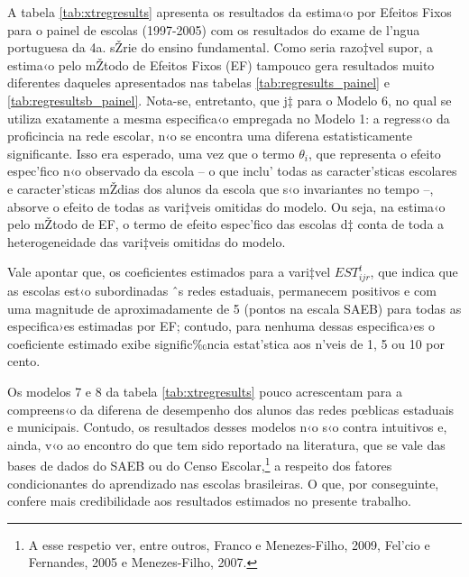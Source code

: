 \documentclass[a4paper, 12pt]{article}
\begin{document}




A tabela \ref{tab:xtregresults} apresenta os resultados da estima‹o por Efeitos Fixos para o painel de escolas (1997-2005) com os resultados do exame de l’ngua portuguesa da 4a. sŽrie do ensino fundamental. Como seria razo‡vel supor, a estima‹o pelo mŽtodo de Efeitos Fixos (EF) tampouco gera resultados muito diferentes daqueles apresentados nas tabelas \ref{tab:regresults_painel} e \ref{tab:regresultsb_painel}. Nota-se, entretanto, que j‡ para o Modelo 6, no qual se utiliza exatamente a mesma especifica‹o empregada no Modelo 1: a regress‹o da proficincia na rede escolar, n‹o se encontra uma diferena estatisticamente significante. Isso era esperado, uma vez que o termo $\theta_{i}$, que representa o efeito espec’fico n‹o observado da escola -- o que inclu’ todas as caracter’sticas escolares e caracter’sticas mŽdias dos alunos da escola que s‹o invariantes no tempo --, absorve o efeito de todas as vari‡veis omitidas do modelo. Ou seja, na estima‹o pelo mŽtodo de EF, o termo de efeito espec’fico das escolas d‡ conta de toda a heterogeneidade das vari‡veis omitidas do modelo. 

Vale apontar que, os coeficientes estimados para a vari‡vel $EST_{ijr}^{t}$, que indica que as escolas est‹o subordinadas ˆs redes estaduais, permanecem positivos e com uma magnitude de aproximadamente de 5 (pontos na escala SAEB) para todas as especifica›es estimadas por EF; contudo, para nenhuma dessas especifica›es o coeficiente estimado exibe signific‰ncia estat’stica aos n’veis de 1, 5 ou 10 por cento.

Os modelos 7 e 8 da tabela \ref{tab:xtregresults} pouco acrescentam para a compreens‹o da diferena de desempenho dos alunos das redes pœblicas estaduais e municipais. Contudo, os resultados desses modelos n‹o s‹o contra intuitivos e, ainda, v‹o ao encontro do que tem sido reportado na literatura,  que se vale das bases de dados do SAEB ou do Censo Escolar,\footnote{A esse respetio ver, entre outros, Franco e Menezes-Filho, 2009, Fel’cio e Fernandes, 2005 e Menezes-Filho, 2007.} a respeito dos fatores condicionantes do aprendizado nas escolas brasileiras. O que, por conseguinte, confere mais credibilidade aos resultados estimados no presente trabalho.
\end{document}
